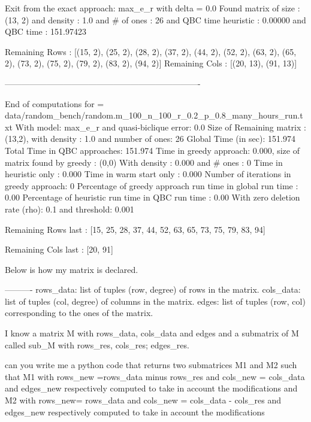         Exit from the exact approach: max_e_r
        with delta =  0.0
        Found matrix of size : (13, 2)
        and density : 1.0
        and # of ones : 26
        and QBC time heuristic  : 0.00000
        and QBC time  : 151.97423
        
 Remaining Rows  : [(15, 2), (25, 2), (28, 2), (37, 2), (44, 2), (52, 2), (63, 2), (65, 2), (73, 2), (75, 2), (79, 2), (83, 2), (94, 2)]
 Remaining  Cols  : [(20, 13), (91, 13)]

----------------------------------------------------------------------
 
    End of computations for = data/random_bench/random.m_100_n_100_r_0.2_p_0.8_many_hours_run.txt 
    With  model: max_e_r and quasi-biclique error: 0.0
    Size of Remaining matrix : (13,2), with  density : 1.0 and number of ones: 26
    Global Time (in sec): 151.974
    Total Time in QBC approaches: 151.974
    Time in greedy approach: 0.000,  size of matrix found by greedy : (0,0) 
    With density : 0.000 and # ones : 0 
    Time in heuristic only : 0.000 
    Time in warm start only : 0.000
    Number of iterations in greedy approach: 0
    Percentage of greedy approach run time in global run time : 0.00%
    Percentage of heuristic run time in QBC run time : 0.00%
    With zero deletion rate (rho): 0.1 and threshold: 0.001
    
 Remaining Rows last : [15, 25, 28, 37, 44, 52, 63, 65, 73, 75, 79, 83, 94]
 
  Remaining  Cols  last : [20, 91]
  
  Below is how my matrix is declared. 
  
      ----------
    rows_data: list of tuples (row, degree) of rows in the matrix.
    cols_data: list of tuples (col, degree) of columns in the matrix.
    edges: list of tuples (row, col) corresponding to the ones of the matrix.
    
    I know a matrix M with rows_data, cols_data and edges
    and a submatrix of M called sub_M with rows_res, cols_res; edges_res. 
    
   can you write me a python code that returns two submatrices M1 and M2 such that 
   M1 with rows_new =rows_data minus rows_res and  cols_new = cols_data and edges_new respectively computed to take in account the modifications
   and 
   M2 with rows_new= rows_data and cols_new =   cols_data - cols_res and edges_new respectively computed  to take in account the modifications 
   
 
